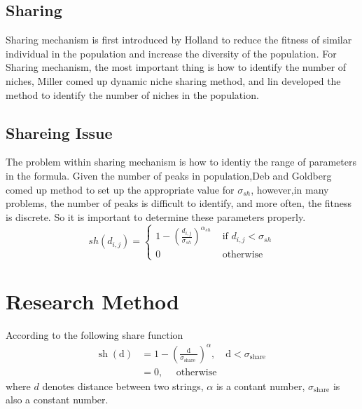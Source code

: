 \documentclass[smallextended]{svjour3}       %
\begin{document}
\begin{multicols}{2}
\begin{center}
\label{plot:GA}
\end{center}

\subsection{Sharing}
Sharing mechanism is first introduced by Holland \cite{miller1996genetic} to reduce the fitness of 
similar individual in the population and increase the diversity of the population. For Sharing mechanism,
the most important thing is how to identify the number of niches, Miller comed up dynamic niche sharing
method, and lin developed the method to identify the number of niches in the population.\cite{lin2002niche}

\subsection{Shareing Issue}
The problem within sharing mechanism is how to identiy the range of parameters in the formula. Given 
the number of peaks in population,Deb and Goldberg comed up method to set up the appropriate value for 
$\sigma_{sh}$, however,in many problems, the number of peaks is difficult to identify, and more often,
the fitness is discrete. So it is important to determine these parameters properly.
\begin{equation}
s h\left(d_{i, j}\right)=\left\{\begin{array}{ll}{1-\left(\frac{d_{i, j}}{\sigma_{s h}}\right)^{\alpha_{s h}}} 
    & {\text { if } d_{i, j}<\sigma_{s h}} \\ 
{0} & {\text { otherwise }}\end{array}\right.
\end{equation}




\section{Research Method}
According to the following share function
$$
\begin{aligned} 
\operatorname{sh}(\mathrm{d}) & = 1 - \left(\frac{\mathrm{d}}{\sigma_{\text {share }}}\right)^{\alpha}, 
                                  \quad \mathrm{d}<\sigma_{\text {share }} \\ 
                              & = 0, \quad \text { otherwise }
\end{aligned}
$$
where $d$ denotes distance between two strings, $\alpha$ is a contant number, $\sigma_{\text {share}}$ 
is also a constant number.


\end{multicols}
\end{document}
